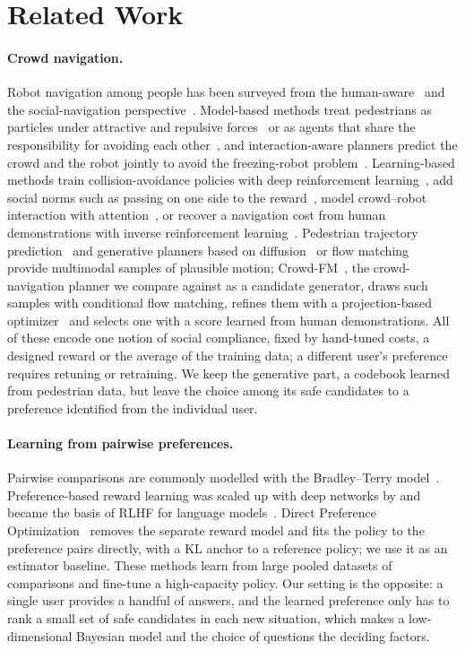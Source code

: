 \section{Related Work}
\label{sec:related}

\paragraph{Crowd navigation.}
Robot navigation among people has been surveyed from the human-aware~\citep{kruse2013human} and the social-navigation
perspective~\citep{mavrogiannis2023core}. Model-based methods treat pedestrians as particles under attractive and repulsive
forces~\citep{helbing1995social} or as agents that share the responsibility for avoiding each other~\citep{vandenberg2011reciprocal},
and interaction-aware planners predict the crowd and the robot jointly to avoid the freezing-robot problem~\citep{trautman2010unfreezing}.
Learning-based methods train collision-avoidance policies with deep reinforcement learning~\citep{chen2017decentralized}, add social norms
such as passing on one side to the reward~\citep{chen2017socially}, model crowd--robot interaction with attention~\citep{chen2019crowd},
or recover a navigation cost from human demonstrations with inverse reinforcement learning~\citep{kretzschmar2016socially}.
Pedestrian trajectory prediction~\citep{alahi2016social,gupta2018social} and generative planners based on diffusion~\citep{janner2022planning}
or flow matching~\citep{lipman2023flow} provide multimodal samples of plausible motion; Crowd-FM~\citep{singha2026crowdfm}, the crowd-navigation planner we compare
against as a candidate generator, draws such samples with conditional flow matching, refines them with a projection-based
optimizer~\citep{rastgar2024priest} and selects one with a score learned from human demonstrations.
All of these encode one notion of social compliance, fixed by hand-tuned costs, a designed reward or the average of the training data;
a different user's preference requires retuning or retraining. We keep the generative part, a codebook learned from pedestrian data,
but leave the choice among its safe candidates to a preference identified from the individual user.

\paragraph{Learning from pairwise preferences.}
Pairwise comparisons are commonly modelled with the Bradley--Terry model~\citep{bradley1952rank}. Preference-based reward learning
was scaled up with deep networks by \citet{christiano2017deep} and became the basis of RLHF for language models~\citep{ouyang2022training}.
Direct Preference Optimization~\citep{rafailov2023direct} removes the separate reward model and fits the policy to the preference pairs
directly, with a KL anchor to a reference policy; we use it as an estimator baseline.
These methods learn from large pooled datasets of comparisons and fine-tune a high-capacity policy. Our setting is the opposite:
a single user provides a handful of answers, and the learned preference only has to rank a small set of safe candidates in each new
situation, which makes a low-dimensional Bayesian model and the choice of questions the deciding factors.

